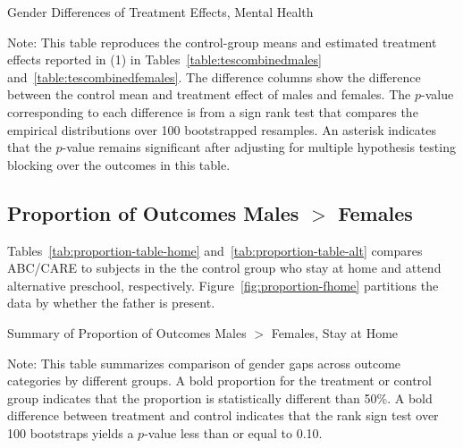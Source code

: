 \begin{table}[!htbp]
\centering
\begin{threeparttable}
\caption{Gender Differences of Treatment Effects, Mental Health}
\begin{scriptsize}

\end{scriptsize}
\begin{tablenotes}
\scriptsize
Note: This table reproduces the control-group means and estimated treatment effects reported in (1) in Tables~\ref{table:tescombinedmales} and~\ref{table:tescombinedfemales}. The difference columns show the difference between the control mean and treatment effect of males and females. The $p$-value corresponding to each difference is from a sign rank test that compares the empirical distributions over 100 bootstrapped resamples. An asterisk indicates that the $p$-value remains significant after adjusting for multiple hypothesis testing blocking over the outcomes in this table.
\end{tablenotes}
\end{threeparttable}
\end{table}

\subsection{Proportion of Outcomes Males $>$ Females}
\label{appendix:propmales-females}

Tables~\ref{tab:proportion-table-home} and~\ref{tab:proportion-table-alt} compares ABC/CARE to subjects in the the control group who stay at home and attend alternative preschool, respectively. Figure~\ref{fig:proportion-fhome} partitions the data by whether the father is present.


\begin{table}[H]
\centering
\caption{Summary of Proportion of Outcomes Males $>$ Females, Stay at Home}
\label{tab:proportion-table-home}
\begin{threeparttable}

\begin{tablenotes}
\footnotesize
\item Note: This table summarizes comparison of gender gaps across outcome categories by different groups. A bold proportion for the treatment or control group indicates that the proportion is statistically different than 50\%. A bold difference between treatment and control indicates that the rank sign test over 100 bootstraps yields a $p$-value less than or equal to 0.10. 
\end{tablenotes}
\end{threeparttable}
\end{table}


